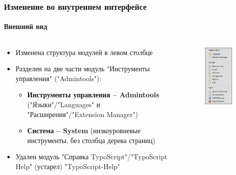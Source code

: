
\begin{frame}[fragile]
	\frametitle{Изменение во внутреннем интерфейсе}
	\framesubtitle{Внешний вид}

	\begin{columns}[T]

		\begin{column}{.5\textwidth}

			\begin{itemize}
				\item Изменена структура модулей в левом столбце
				\item Разделен на две части модуль "Инструменты управления" ("Admintools"):

					\begin{itemize}
						\item \textbf{Инструменты управления – Admintools} ("Языки"/"Languages" и "Расширения"/"Extension
						Manager")
						\item \textbf{Система – System} (низкоуровневые инструменты, без столбца дерева страниц)
					\end{itemize}

				\item Удален модуль "Справка TypoScript"/"TypoScript Help" (устарел)
				"TypoScript-Help"

			\end{itemize}

		\end{column}

		\begin{column}{.5\textwidth}
			\begin{figure}\vspace*{-0.4cm}
				\includegraphics[width=0.35\linewidth]{Images/BackendChanges/AdminTools.png}
			\end{figure}
		\end{column}

	\end{columns}

\end{frame}

